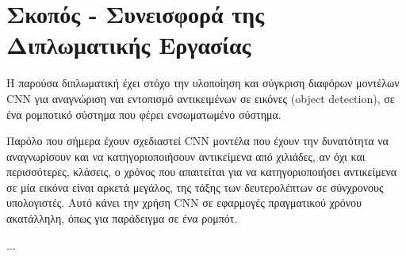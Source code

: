 \section{Σκοπός - Συνεισφορά της Διπλωματικής Εργασίας}
\label{section:contribution}
Η παρούσα διπλωματική έχει στόχο την υλοποίηση και σύγκριση διαφόρων
μοντέλων CNN για αναγνώριση ναι εντοπισμό αντικειμένων σε εικόνες
(object detection), σε ένα ρομποτικό σύστημα που φέρει ενσωματωμένο σύστημα.

Παρόλο που σήμερα έχουν σχεδιαστεί CNN μοντέλα που έχουν την δυνατότητα να
αναγνωρίσουν και να κατηγοριοποιήσουν αντικείμενα από χιλιάδες, αν όχι και περισσότερες, κλάσεις, ο χρόνος που
απαιτείται για να κατηγοριοποιήσει αντικείμενα σε μία εικόνα είναι αρκετά μεγάλος,
της τάξης των δευτερολέπτων σε σύνχρονους υπολογιστές.
Αυτό κάνει την χρήση CNN σε εφαρμογές πραγματικού
χρόνου ακατάλληλη, όπως για παράδειγμα σε ένα ρομπότ.

...
